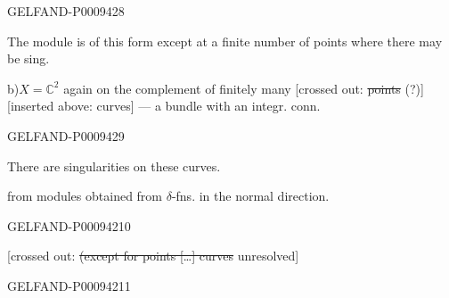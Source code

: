 \begin{GelfandAdjacentEvidence}{GELFAND-P000942}{8}


The module is of this form except at a finite number of points where there may be sing.

b)\enspace $X=\mathbb C^2$ again on the complement of finitely many [crossed out: \sout{points} (?)]
[inserted above: curves] --- a bundle with an integr. conn.
\end{GelfandAdjacentEvidence}
\begin{GelfandAdjacentEvidence}{GELFAND-P000942}{9}


There are singularities on these curves.

 from modules obtained from $\delta$-fns. in the normal direction.
\end{GelfandAdjacentEvidence}
\begin{GelfandAdjacentEvidence}{GELFAND-P000942}{10}


[crossed out: \sout{(except for points […] curves} unresolved]
\end{GelfandAdjacentEvidence}
\begin{GelfandAdjacentEvidence}{GELFAND-P000942}{11}

\end{GelfandAdjacentEvidence}


